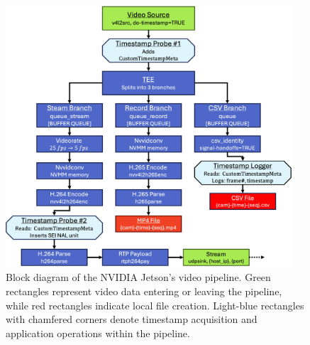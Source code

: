 \documentclass{erauthesis}
\begin{document}
\begin{figure}[htbp]
\centering
\includegraphics[width=0.95\textwidth]{Images/gstreamer_block.png}
\caption{Block diagram of the NVIDIA Jetson's video pipeline. Green rectangles represent video data entering or leaving the pipeline, while red rectangles indicate local file creation. Light-blue rectangles with chamfered corners denote timestamp acquisition and application operations within the pipeline.}
\label{video_pipeline}
\end{figure}



%        
\end{document}

